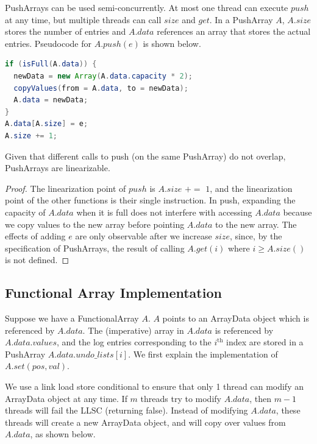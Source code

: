 \documentclass[preprint]{sigplanconf}
\begin{document}
PushArrays can be used semi-concurrently. At most one thread can execute $push$ at any time, but multiple threads can call $size$ and $get$. In a PushArray $A$, $A.size$ stores the number of entries and $A.data$ references an array that stores the actual entries. Pseudocode for $A.push(e)$ is shown below.

\begin{lstlisting}[language=Java]
if (isFull(A.data)) {
  newData = new Array(A.data.capacity * 2);
  copyValues(from = A.data, to = newData);
  A.data = newData;
}
A.data[A.size] = e;
A.size += 1;
\end{lstlisting}

\begin{theorem}
Given that different calls to push (on the same PushArray) do not overlap, PushArrays are linearizable.
\end{theorem}

\begin{proof}
The linearization point of $push$ is $A.size$ $+=$ $1$, and the linearization point of the other functions is their single instruction. In push, expanding the capacity of $A.data$ when it is full does not interfere with accessing $A.data$ because we copy values to the new array before pointing $A.data$ to the new array. The effects of adding $e$ are only observable after we increase $size$, since, by the specification of PushArrays, the result of calling $A.get(i)$ where $i \geq A.size()$ is not defined.
\end{proof}

\subsection{Functional Array Implementation}

Suppose we have a FunctionalArray $A$. $A$ points to an ArrayData object which is referenced by $A.data$. The (imperative) array in $A.data$ is referenced by $A.data.values$, and the log entries corresponding to the $i^{\text{th}}$ index are stored in a PushArray $A.data.undo\_lists[i]$. We first explain the implementation of $A.set(pos, val)$.

We use a link load store conditional to ensure that only 1 thread can modify an ArrayData object at any time. If $m$ threads try to modify $A.data$, then $m-1$ threads will fail the LLSC (returning false). Instead of modifying $A.data$, these threads will create a new ArrayData object, and will copy over values from $A.data$, as shown below.
\end{document}

